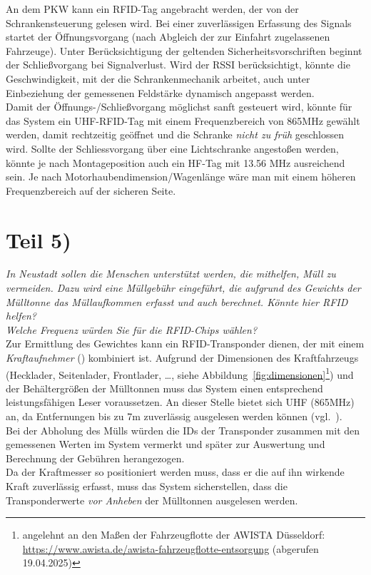 \noindent
An dem PKW kann ein RFID-Tag angebracht werden, der von der Schrankensteuerung gelesen wird.
Bei einer zuverlässigen Erfassung des Signals startet der Öffnungsvorgang (nach Abgleich der zur Einfahrt zugelassenen Fahrzeuge).
Unter Berücksichtigung der geltenden Sicherheitsvorschriften beginnt der Schließvorgang bei Signalverlust.
Wird der RSSI berücksichtigt, könnte die Geschwindigkeit, mit der die Schrankenmechanik arbeitet, auch unter Einbeziehung der gemessenen Feldstärke dynamisch angepasst werden.\\
Damit der Öffnungs-/Schließvorgang möglichst sanft gesteuert wird, könnte für das System ein UHF-RFID-Tag mit einem Frequenzbereich von 865MHz gewählt werden, damit rechtzeitig geöffnet und die Schranke \textit{nicht zu früh} geschlossen wird.
Sollte der Schliessvorgang über eine Lichtschranke angestoßen werden, könnte je nach Montageposition auch ein HF-Tag mit 13.56 MHz ausreichend sein.
Je nach Motorhaubendimension/Wagenlänge wäre man mit einem höheren Frequenzbereich auf der sicheren Seite.

\section{Teil 5)}

\textit{In Neustadt sollen die Menschen unterstützt werden, die mithelfen, Müll zu vermeiden. Dazu wird eine Müllgebühr eingeführt, die
aufgrund des Gewichts der Mülltonne das Müllaufkommen erfasst
und auch berechnet. Könnte hier RFID helfen?\\Welche Frequenz würden Sie für die RFID-Chips wählen?}\\

\noindent
Zur Ermittlung des Gewichtes kann ein RFID-Transponder dienen, der mit einem \textit{Kraftaufnehmer} (\cite[69]{ES5}) kombiniert ist.
Aufgrund der Dimensionen des Kraftfahrzeugs (Hecklader, Seitenlader, Frontlader, \ldots, siehe Abbildung~\ref{fig:dimensionen}\footnote{
angelehnt an den Maßen der Fahrzeugflotte der AWISTA Düsseldorf: \url{https://www.awista.de/awista-fahrzeugflotte-entsorgung} (abgerufen 19.04.2025)
}) und der Behältergrößen der Mülltonnen muss das System einen entsprechend leistungsfähigen Leser voraussetzen.
An dieser Stelle bietet sich UHF (865MHz) an, da Entfernungen bis zu 7m zuverlässig ausgelesen werden können (vgl.~\cite[132 f.]{ES5}).\\
Bei der Abholung des Mülls würden die IDs der Transponder zusammen mit den gemessenen Werten im System vermerkt und später zur Auswertung und Berechnung der Gebühren herangezogen.\\
Da der Kraftmesser so positioniert werden muss, dass er die auf ihn wirkende Kraft zuverlässig erfasst, muss das System sicherstellen, dass die Transponderwerte \textit{vor Anheben} der Mülltonnen ausgelesen werden.

